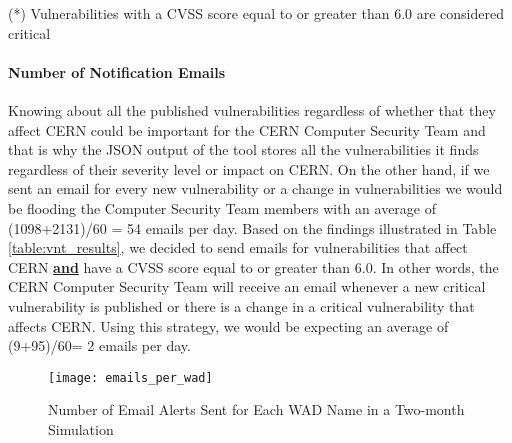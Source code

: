\begin{table}[H]
\begin{center}
    \caption{VNT Results from 01.11.2014 to 31.12.2014}
    \label{table:vnt_results}
   \end{center}
   \footnotesize{(*) Vulnerabilities with a CVSS score equal to or greater than 6.0 are considered critical}
    \end{table}


\paragraph{Number of Notification Emails}
Knowing about all the published vulnerabilities regardless of whether that they affect CERN could be important for the CERN Computer Security Team and that is why the JSON output of the tool stores all the vulnerabilities it finds regardless of their severity level or impact on CERN. On the other hand, if we sent an email for every new vulnerability or a change in vulnerabilities we would be flooding the Computer Security Team members with an average of (1098+2131)/60 = 54 emails per day. Based on the findings illustrated in Table \ref{table:vnt_results}, we decided to send emails for vulnerabilities that affect CERN \underline{\textbf{and}} have a CVSS score equal to or greater than 6.0. In other words, the CERN Computer Security Team will receive an email whenever a new critical vulnerability is published or there is a change in a critical vulnerability that affects CERN. Using this strategy, we would be expecting an average of (9+95)/60= 2 emails per day. 
\begin{figure}[H]

  \centering
    \texttt{[image: emails\_per\_wad]}
  \caption{Number of Email Alerts Sent for Each WAD Name in a Two-month Simulation}
  \label{figure:emails_per_wad}
\end{figure}

